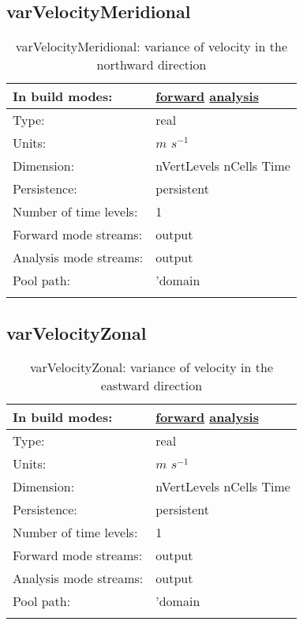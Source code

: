 \subsection[varVelocityMeridional]{varVelocityMeridional}
\label{subsec:var_sec_average_varVelocityMeridional}
\begin{center}
\begin{longtable}{| p{2.0in} | p{4.0in} |}
        \hline 
        In build modes: & \hyperref[subsec:forward_var_tab_average]{forward} \hyperref[subsec:analysis_var_tab_average]{analysis} \\
        \hline 
        Type: & real \\
        \hline 
        Units: & $m$ $s^{-1}$ \\
        \hline 
        Dimension: & nVertLevels nCells Time \\
        \hline 
        Persistence: & persistent \\
        \hline 
        Number of time levels: & 1 \\
        \hline 
		 Forward mode streams: &  output \\
        \hline 
		 Analysis mode streams: &  output \\
        \hline 
            Pool path: & 'domain %
 \\
		 \hline 
    \caption{varVelocityMeridional: variance of velocity in the northward direction}
\end{longtable}
\end{center}
\subsection[varVelocityZonal]{varVelocityZonal}
\label{subsec:var_sec_average_varVelocityZonal}
\begin{center}
\begin{longtable}{| p{2.0in} | p{4.0in} |}
        \hline 
        In build modes: & \hyperref[subsec:forward_var_tab_average]{forward} \hyperref[subsec:analysis_var_tab_average]{analysis} \\
        \hline 
        Type: & real \\
        \hline 
        Units: & $m$ $s^{-1}$ \\
        \hline 
        Dimension: & nVertLevels nCells Time \\
        \hline 
        Persistence: & persistent \\
        \hline 
        Number of time levels: & 1 \\
        \hline 
		 Forward mode streams: &  output \\
        \hline 
		 Analysis mode streams: &  output \\
        \hline 
            Pool path: & 'domain %
 \\
		 \hline 
    \caption{varVelocityZonal: variance of velocity in the eastward direction}
\end{longtable}
\end{center}
